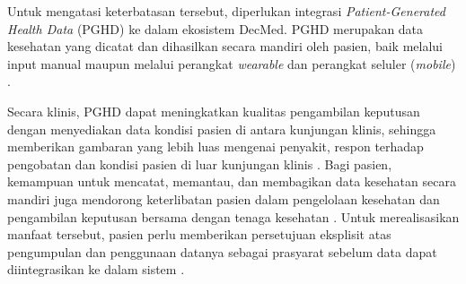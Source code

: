 Untuk mengatasi keterbatasan tersebut, diperlukan integrasi \textit{Patient-Generated Health Data} (PGHD) ke dalam ekosistem DecMed.
PGHD merupakan data kesehatan yang dicatat dan dihasilkan secara mandiri oleh pasien, baik melalui input manual maupun melalui perangkat \textit{wearable} dan perangkat seluler (\textit{mobile}) \parencite{Cohen_Keller_Hayes_Dorr_Ash_Sittig_2016_PGHD_Integration_EHR}.

Secara klinis, PGHD dapat meningkatkan kualitas pengambilan keputusan dengan menyediakan data kondisi pasien di antara kunjungan klinis, sehingga memberikan gambaran yang lebih luas mengenai penyakit, respon terhadap pengobatan dan kondisi pasien di luar kunjungan klinis \parencite{Nazi2024_Unleashing_PGHD}.
Bagi pasien, kemampuan untuk mencatat, memantau, dan membagikan data kesehatan secara mandiri juga mendorong keterlibatan pasien dalam pengelolaan kesehatan dan pengambilan keputusan bersama dengan tenaga kesehatan \parencite{Khatiwada_Yang_Lin_Blobel_2024_PGHD_Understanding}.
Untuk merealisasikan manfaat tersebut, pasien perlu memberikan persetujuan eksplisit atas pengumpulan dan penggunaan datanya sebagai prasyarat sebelum data dapat diintegrasikan ke dalam sistem \parencite{Nazi2024_Unleashing_PGHD}.

